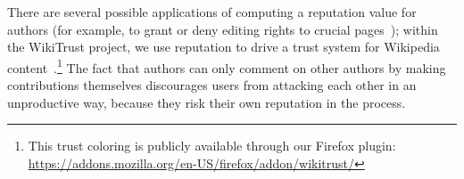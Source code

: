 There are several possible applications of computing a reputation
value for authors (for example, to grant or deny editing rights to
crucial pages~\cite{Blaze1996}); within the WikiTrust project,
we use reputation to drive a trust system for
Wikipedia content~\cite{Adler2008b}.\footnote{This trust coloring
is publicly available through our Firefox plugin:
\url{https://addons.mozilla.org/en-US/firefox/addon/wikitrust/}}
The fact that authors can only comment on other authors by
making contributions themselves discourages users from attacking
each other in an unproductive way, because they risk their own reputation in the process.

